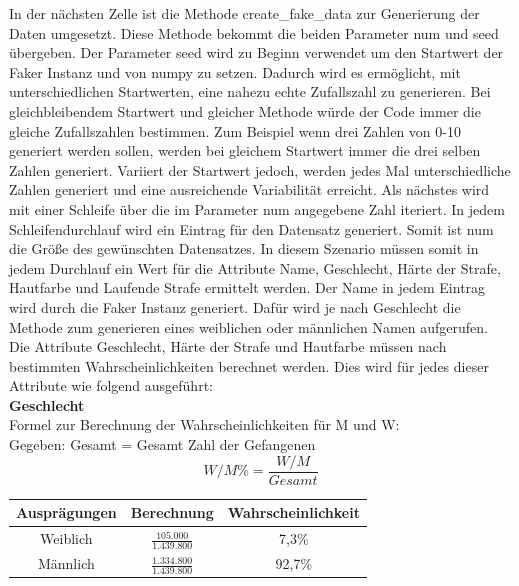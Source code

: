 \begin{onehalfspace}
In der nächsten Zelle ist die Methode \glqq{}create\_fake\_data\grqq{} zur Generierung der Daten umgesetzt. Diese Methode bekommt die beiden Parameter \glqq{}num\grqq{} und \glqq{}seed\grqq{} übergeben. Der Parameter \glqq{}seed\grqq{} wird zu Beginn verwendet um den Startwert der Faker Instanz und von \glqq{}numpy\grqq{} zu setzen. Dadurch wird es ermöglicht, mit unterschiedlichen Startwerten, eine nahezu \glqq{}echte\grqq{} Zufallszahl zu generieren. Bei gleichbleibendem Startwert und gleicher Methode würde der Code immer die gleiche Zufallszahlen bestimmen. Zum Beispiel wenn drei Zahlen von 0-10 generiert werden sollen, werden bei gleichem Startwert immer die drei selben Zahlen generiert. Variiert der Startwert jedoch, werden jedes Mal unterschiedliche Zahlen generiert und eine ausreichende Variabilität erreicht. Als nächstes wird mit einer Schleife über die im Parameter \glqq{}num\grqq{} angegebene Zahl iteriert. In jedem Schleifendurchlauf wird ein Eintrag für den Datensatz generiert. Somit ist \glqq{}num\grqq{} die Größe des gewünschten Datensatzes. In diesem Szenario müssen somit in jedem Durchlauf ein Wert für die Attribute Name, Geschlecht, Härte der Strafe, Hautfarbe und Laufende Strafe ermittelt werden. Der Name in jedem Eintrag wird durch die Faker Instanz generiert. Dafür wird je nach Geschlecht die Methode zum generieren eines weiblichen oder männlichen Namen aufgerufen. Die Attribute Geschlecht, Härte der Strafe und Hautfarbe müssen nach bestimmten Wahrscheinlichkeiten berechnet werden. Dies wird für jedes dieser Attribute wie folgend ausgeführt:\\
\textbf{Geschlecht}\\
Formel zur Berechnung der Wahrscheinlichkeiten für \ac{M} und \ac{W}:\\
Gegeben: Gesamt = Gesamt Zahl der Gefangenen\\
\begin{equation}
    W/M\% = \frac{W/M}{Gesamt}\label{eq:Sz1Mänlich}
\end{equation}
\begin{table}[!h]
    \centering
    \begin{tabular}{|c|c|c|}
    \hline
    \textbf{Ausprägungen} & \textbf{Berechnung} & \textbf{Wahrscheinlichkeit} \\ \hline
    Weiblich              &\rule{0pt}{18pt} $\frac{105.000}{1.439.800}$  & 7,3\% \\[8pt] \hline
    Männlich              & \rule{0pt}{18pt}$\frac{1.334.800}{1.439.800}$     & 92,7\%  \\[8pt] \hline

\end{tabular}
\end{table}
\end{onehalfspace}
